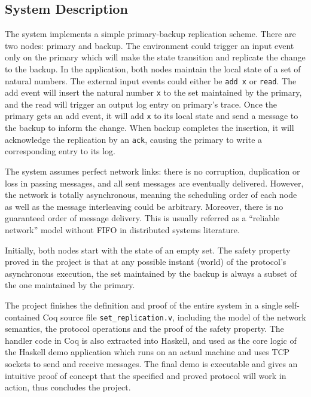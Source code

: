\documentclass[twocolumn]{article}
\begin{document}
\subsection{System Description}
The system implements a simple primary-backup replication scheme. There are two
nodes: primary and backup. The environment could trigger an input event only on
the primary which will make the state transition and replicate the change to
the backup. In the application, both nodes maintain the local state of a set of
natural numbers. The external input events could either be \texttt{add x} or
\texttt{read}. The add event will insert the natural number \texttt{x} to the
set maintained by the primary, and the read will trigger an output log entry on
primary's trace. Once the primary gets an add event, it will add \texttt{x} to
its local state and send a message to the backup to inform the change. When backup
completes the insertion, it will acknowledge the replication by an
\texttt{ack}, causing the primary to write a corresponding entry to its log.

The system assumes perfect network links: there is no corruption, duplication
or loss in passing messages, and all sent messages are eventually delivered.
However, the network is totally asynchronous, meaning the scheduling order of each
node as well as the message interleaving could be arbitrary. Moreover, there is
no guaranteed order of message delivery. This is usually referred as a
``reliable network'' model without FIFO in distributed systems literature.

Initially, both nodes start with the state of an empty set. The safety property
proved in the project is that at any possible instant (world) of the protocol's
asynchronous execution, the set maintained by the backup is always a subset of
the one maintained by the primary.

The project finishes the definition and proof of the entire system in a single
self-contained Coq source file \texttt{set\_replication.v}, including the
model of the network semantics, the protocol operations and the proof of
the safety property. The handler code in Coq is also extracted into Haskell, and used
as the core logic of the Haskell demo application which runs on an actual
machine and uses TCP sockets to send and receive messages. The final demo is
executable and gives an intuitive proof of concept that the specified and
proved protocol will work in action, thus concludes the project.
\end{document}
